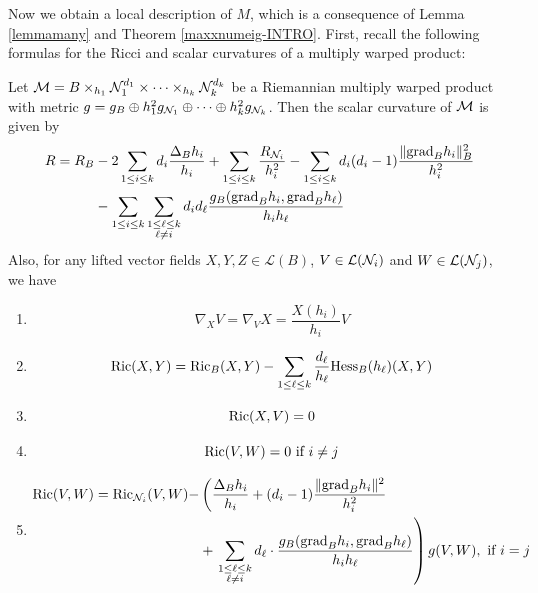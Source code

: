         Now we obtain a local description of $M$, which is a consequence of Lemma \ref{lemmamany} and Theorem \cref{maxxnumeig-INTRO}. First, recall the following formulas for the Ricci and scalar curvatures of a multiply warped product:\\

        \begin{lema}\label{warped}
        Let $\mathcal{M} = B \times_{h_1} \mathcal{N}_1^{d_1} \times \cdots \times_{h_k} \mathcal{N}_{k}^{d_k}$ be a Riemannian multiply warped product with metric $g = g_{B} \oplus h_1^2 g_{\mathcal{N}_1} \oplus \cdots \oplus h_{k}^2 g_{\mathcal{N}_k}$. Then the scalar curvature of $\mathcal{M}$ is given by
        \begin{equation}\label{ScalWarped}
        \begin{aligned}
        R = R_{B} &- 2 \sum_{1 \leq i \leq k} d_i \frac{\Delta_B h_i}{h_i} + \sum_{1 \leq i \leq k} \frac{R_{\mathcal{N}_i}}{h_i^2} - \sum_{1 \leq i \leq k} d_i(d_i - 1) \frac{\| \textnormal{grad}_B h_i \|_B^2}{h_i^2} \\
        &- \sum_{1 \leq i \leq k} \sum_{\substack{1 \leq \ell \leq k \\
        \ell \neq i  \\
        }} d_i d_{\ell} \frac{g_B(\textnormal{grad}_B h_i, \textnormal{grad}_B h_{\ell})}{h_i h_{\ell}}
        \end{aligned}
        \end{equation}
        Also, for any lifted vector fields $X, Y, Z \in \mathcal{L}(B)$, $V \in \mathcal{L}(\mathcal{N}_i)$ and $W \in \mathcal{L}(\mathcal{N}_j)$, we have
        \begin{enumerate}[label=\color{MH}\normalfont\textbf{(\theenumi)}]
        \item\label{NablaWarp} \[
        \nabla_X V = \nabla_V X = \frac{X(h_i)}{h_i} V
        \]
        \item\label{RicXY} \[
        \mathrm{Ric}(X, Y) = \mathrm{Ric}_B(X,Y) - \sum_{1 \leq \ell \leq k} \frac{d_{\ell}}{h_{\ell}} \textnormal{Hess}_B(h_{\ell})(X, Y)
        \]
        \item\label{RicXV} \[
        \mathrm{Ric}(X, V) = 0
        \]
        \item\label{RicVWd} \[
        \mathrm{Ric}(V, W) = 0 \text{ if } i \neq j
        \]
        \item\label{RicVWi} \[ \begin{aligned}
        \mathrm{Ric}(V, W) = \mathrm{Ric}_{\mathcal{N}_i}(V, W) - &\left(\frac{\Delta_B h_i}{h_i} + (d_i - 1) \frac{\| \textnormal{grad}_{B} h_i \|^2}{h_i^2} \right.\\ &+ \left.\sum_{\substack{1 \leq \ell \leq k \\
        \ell \neq i  \\
        }} d_{\ell} \cdot \frac{g_B(\textnormal{grad}_B h_i, \textnormal{grad}_B h_{\ell})}{h_i h_{\ell}} \right) g(V, W), \text{ if } i = j
        \end{aligned}
        \]
        \end{enumerate}
        \end{lema}
        
